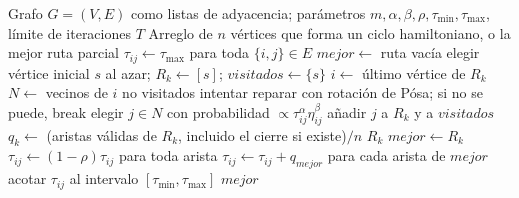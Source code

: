 \begin{algorithm}[H]
\caption{ACO para el ciclo hamiltoniano (variante estilo MMAS)}
\label{aco:alg:aco}
\begin{algorithmic}[1]
\Require Grafo $G=(V,E)$ como listas de adyacencia; parámetros $m,\alpha,\beta,\rho,
         \tau_{\min},\tau_{\max}$, límite de iteraciones $T$
\Ensure Arreglo de $n$ vértices que forma un ciclo hamiltoniano, o la mejor ruta parcial
\State $\tau_{ij}\gets\tau_{\max}$ para toda $\{i,j\}\in E$
\State $\mathit{mejor}\gets$ ruta vacía
    \State elegir vértice inicial $s$ al azar; $R_k\gets[s]$; $\mathit{visitados}\gets\{s\}$
      \State $i\gets$ último vértice de $R_k$
      \State $N\gets$ vecinos de $i$ no visitados
        \State intentar reparar con rotación de Pósa; si no se puede, break
      \Else
        \State elegir $j\in N$ con probabilidad $\propto\tau_{ij}^{\alpha}\eta_{ij}^{\beta}$
        \State añadir $j$ a $R_k$ y a $\mathit{visitados}$
      \EndIf
    \EndWhile
    \State $q_k\gets$ (aristas válidas de $R_k$, incluido el cierre si existe)$/n$
     \Return $R_k$ 
    \EndIf
     $\mathit{mejor}\gets R_k$
    \EndIf
  \EndFor
  \State $\tau_{ij}\gets(1-\rho)\tau_{ij}$ para toda arista 
  \State $\tau_{ij}\gets\tau_{ij}+q_{\mathit{mejor}}$ para cada arista de $\mathit{mejor}$
  \State acotar $\tau_{ij}$ al intervalo $[\tau_{\min},\tau_{\max}]$
\EndFor
\State \Return $\mathit{mejor}$
\end{algorithmic}
\end{algorithm}

